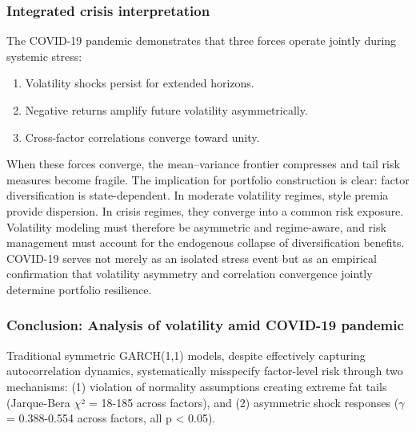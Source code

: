 \documentclass{article}
\begin{document}
\subsubsection{Integrated crisis interpretation}

The COVID-19 pandemic demonstrates that three forces operate jointly during systemic stress:

\begin{enumerate}
\item Volatility shocks persist for extended horizons.
\item Negative returns amplify future volatility asymmetrically.
\item Cross-factor correlations converge toward unity.
\end{enumerate}

When these forces converge, the mean–variance frontier compresses and tail risk measures become fragile. The implication for portfolio construction is clear: factor diversification is state-dependent. In moderate volatility regimes, style premia provide dispersion. In crisis regimes, they converge into a common risk exposure. Volatility modeling must therefore be asymmetric and regime-aware, and risk management must account for the endogenous collapse of diversification benefits. COVID-19 serves not merely as an isolated stress event but as an empirical confirmation that volatility asymmetry and correlation convergence jointly determine portfolio resilience.\newline

\subsubsection{Conclusion: Analysis of volatility amid COVID-19 pandemic}

Traditional symmetric GARCH(1,1) models, despite effectively capturing autocorrelation dynamics, systematically misspecify factor-level risk through two mechanisms: (1) violation of normality assumptions creating extreme fat tails (Jarque-Bera $\chi$² = 18-185 across factors), and (2) asymmetric shock responses ($\gamma$ = 0.388-0.554 across factors, all p < 0.05).\newline
\end{document}
